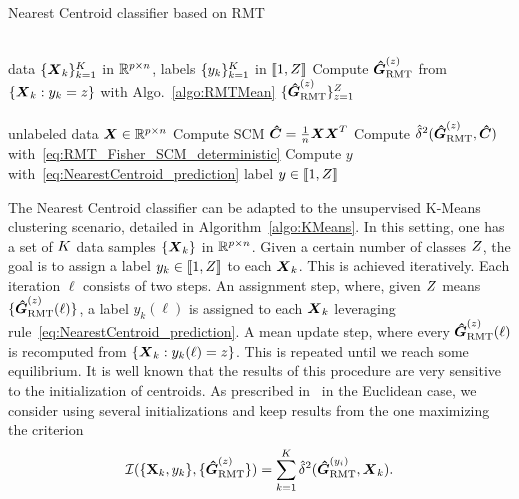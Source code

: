 \documentclass{article}
\theoremstyle{plain}
\theoremstyle{definition}
\theoremstyle{remark}
\begin{document}
\begin{algorithm}[t]
    \caption{Nearest Centroid classifier based on RMT}
    \label{algo:NearestCentroid}
    \begin{algorithmic}
        \\ \vspace*{-5pt} \hrulefill 
            data $\{\boldsymbol{X}_k\}_{k=1}^{K}$ in $\mathbb{R}^{p\times n}$,
            labels $\{y_k\}_{k=1}^{K}$ in $\llbracket1,Z\rrbracket$
        \STATE Compute $\boldsymbol{\hat{G}}_{\textup{RMT}}^{(z)}$ from $\{\boldsymbol{X}_k: y_k=z\}$ with Algo.~\ref{algo:RMTMean}
        \ENDFOR
         $\{\boldsymbol{\hat{G}}_{\textup{RMT}}^{(z)}\}_{z=1}^{Z}$
        \\ \hrulefill
        \\ \vspace*{-5pt} \hrulefill
            unlabeled data $\boldsymbol{X}\in\mathbb{R}^{p\times n}
            $
        \STATE Compute SCM $\boldsymbol{\hat{C}}=\frac1{n}\boldsymbol{X}\boldsymbol{X}^T$
        \STATE Compute $\hat{\delta}^2(\boldsymbol{\hat{G}}_{\textup{RMT}}^{(z)},\boldsymbol{\hat{C}})$ with~\eqref{eq:RMT_Fisher_SCM_deterministic}
        \ENDFOR
        \STATE Compute $y$ with~\eqref{eq:NearestCentroid_prediction} 
         label $y\in\llbracket1,Z\rrbracket$
    \end{algorithmic}
\end{algorithm}

The Nearest Centroid classifier can be adapted to the unsupervised K-Means clustering scenario, detailed in Algorithm~\ref{algo:KMeans}.
In this setting, one has a set of $K$ data samples $\{\boldsymbol{X}_k\}$ in $\mathbb{R}^{p\times n}$.
Given a certain number of classes $Z$, the goal is to assign a label $y_k\in\llbracket1,Z\rrbracket$ to each $\boldsymbol{X}_k$.
This is achieved iteratively.
%
Each iteration $\ell$ consists of two steps.
An assignment step, where, given $Z$ means $\{\boldsymbol{\hat{G}}_{\textup{RMT}}^{(z)}(\ell)\}$, a label $y_k(\ell)$ is assigned to each $\boldsymbol{X}_k$ leveraging rule~\eqref{eq:NearestCentroid_prediction}.
A mean update step, where every $\boldsymbol{\hat{G}}_{\textup{RMT}}^{(z)}(\ell)$ is recomputed from $\{\boldsymbol{X}_k: y_k(\ell)=z\}$.
This is repeated until we reach some equilibrium.
%
It is well known that the results of this procedure are very sensitive to the initialization of centroids.
As prescribed in~\cite{arthur2007k} in the Euclidean case, we consider using several initializations and keep results from the one maximizing the criterion
\begin{equation}
    \mathcal{I}(\{\mathbf{X}_k, y_k\}, \{\boldsymbol{\hat{G}}_{\textup{RMT}}^{(z)}\}) = \sum_{k=1}^{K} \hat{\delta}^2(\boldsymbol{\hat{G}}_{\textup{RMT}}^{(y_i)},\boldsymbol{X}_k).
    \label{eq:KMeans_inertia}
\end{equation}
\end{document}
